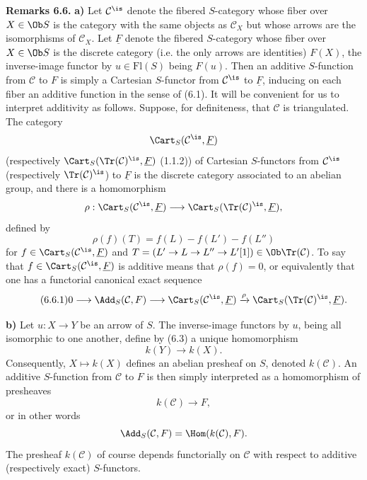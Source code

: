 \textbf{Remarks 6.6.} \textbf{a)} Let \(\mathcal C^{\is}\) denote the fibered \(S\)-category whose fiber over \(X\in\Ob S\) is the category with the same objects as \(\mathcal C_X\) but whose arrows are the isomorphisms of \(\mathcal C_X\). Let \(\underline F\) denote the fibered \(S\)-category whose fiber over \(X\in\Ob S\) is the discrete category (i.e. the only arrows are identities) \(F(X)\), the inverse-image functor by \(u\in\mathrm{Fl}(S)\) being \(F(u)\). Then an additive \(S\)-function from \(\mathcal C\) to \(F\) is simply a Cartesian \(S\)-functor from \(\mathcal C^{\is}\) to \(\underline F\), inducing on each fiber an additive function in the sense of (6.1). It will be convenient for us to interpret additivity as follows. Suppose, for definiteness, that \(\mathcal C\) is triangulated. The category
\[
  \Cart_S(\mathcal C^{\is},\underline F)
\]
(respectively \(\Cart_S(\Tr(\mathcal C)^{\is},\underline F)\) (1.1.2)) of Cartesian \(S\)-functors from \(\mathcal C^{\is}\) (respectively \(\Tr(\mathcal C)^{\is}\)) to \(\underline F\) is the discrete category associated to an abelian group, and there is a homomorphism
\[
  \rho:\Cart_S(\mathcal C^{\is},\underline F)
  \longrightarrow
  \Cart_S(\Tr(\mathcal C)^{\is},\underline F),
\]
defined by
\[
  \rho(f)(T)=f(L)-f(L')-f(L'')
\]
for \(f\in\Cart_S(\mathcal C^{\is},\underline F)\) and \(T=(L'\to L\to L''\to L'[1])\in\Ob\Tr(\mathcal C)\). To say that \(f\in\Cart_S(\mathcal C^{\is},\underline F)\) is additive means that \(\rho(f)=0\), or equivalently that one has a functorial canonical exact sequence
\begin{equation}\tag{6.6.1}
  0\longrightarrow \Add_S(\mathcal C,F)
  \longrightarrow \Cart_S(\mathcal C^{\is},\underline F)
  \xrightarrow{\rho}
  \Cart_S(\Tr(\mathcal C)^{\is},\underline F).
\end{equation}

\textbf{b)} Let \(u:X\to Y\) be an arrow of \(S\). The inverse-image functors by \(u\), being all isomorphic to one another, define by (6.3) a unique homomorphism
\[
  k(Y)\longrightarrow k(X).
\]
Consequently, \(X\mapsto k(X)\) defines an abelian presheaf on \(S\), denoted \(k(\mathcal C)\). An additive \(S\)-function from \(\mathcal C\) to \(F\) is then simply interpreted as a homomorphism of presheaves
\[
  k(\mathcal C)\longrightarrow F,
\]
or in other words
\[
  \Add_S(\mathcal C,F)=\Hom(k(\mathcal C),F).
\]
The presheaf \(k(\mathcal C)\) of course depends functorially on \(\mathcal C\) with respect to additive (respectively exact) \(S\)-functors.

